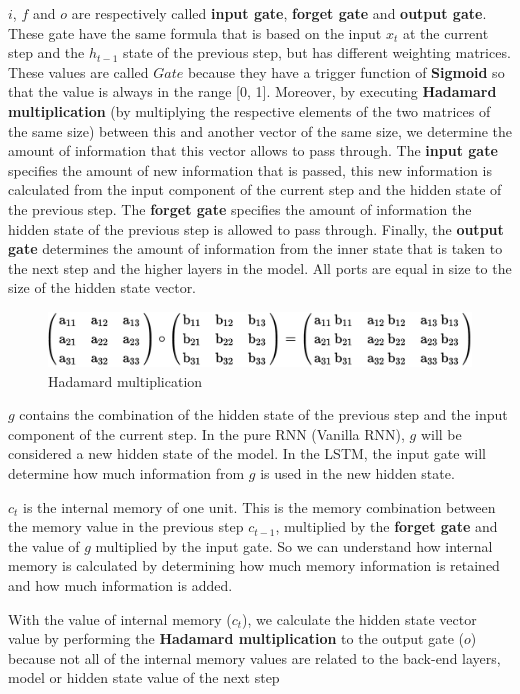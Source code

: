 $i$, $f$ and $o$ are respectively called \textbf{input gate}, \textbf{forget gate} and \textbf{output gate}. These gate have the same formula that is based on the input $x_{t}$ at the current step and the $h_{t-1}$ state of the previous step, but has different weighting matrices. These values are called $Gate$ because they have a trigger function of \textbf{Sigmoid} so that the value is always in the range [0, 1]. Moreover, by executing \textbf{Hadamard multiplication} (by multiplying the respective elements of the two matrices of the same size) between this and another vector of the same size, we determine the amount of information that this vector allows to pass through. The \textbf{input gate} specifies the amount of new information that is passed, this new information is calculated from the input component of the current step and the hidden state of the previous step. The \textbf{forget gate} specifies the amount of information the hidden state of the previous step is allowed to pass through. Finally, the \textbf{output gate} determines the amount of information from the inner state that is taken to the next step and the higher layers in the model. All ports are equal in size to the size of the hidden state vector.
\begin{center}
  \begin{figure}[H]
  \centering
  \includegraphics[width=0.8\columnwidth]{images/chap2/Hadamard.png}
  \caption{Hadamard multiplication}
  \label{chap2:WSP}
  \end{figure}
\end{center}
$g$ contains the combination of the hidden state of the previous step and the input component of the current step. In the pure RNN (Vanilla RNN), $g$ will be considered a new hidden state of the model. In the LSTM, the input gate will determine how much information from $g$ is used in the new hidden state.

$c_{t}$ is the internal memory of one unit. This is the memory combination between the memory value in the 
previous step $c_{t-1}$, multiplied by the \textbf{forget gate} and the value of $g$ multiplied by the input gate. So we can understand how internal memory is calculated by determining how much memory information is retained and how much information is added.

With the value of internal memory ($c_{t}$), we calculate the hidden state vector value by performing the \textbf{Hadamard multiplication} to the output gate ($o$) because not all of the internal memory values are related to the back-end layers, model or hidden state value of the next step



